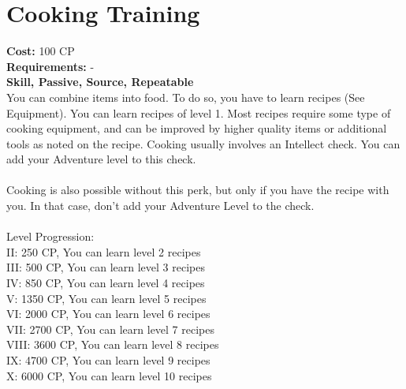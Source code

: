 \section{Cooking Training}
\textbf{Cost:} 100 CP\\
\textbf{Requirements:} -\\
\textbf{Skill, Passive, Source, Repeatable}\\
You can combine items into food. To do so, you have to learn recipes (See Equipment). You can learn recipes of level 1. Most recipes require some type of cooking equipment, and can be improved by higher quality items or additional tools as noted on the recipe. Cooking usually involves an Intellect check. You can add your Adventure level to this check. \\
\\
Cooking is also possible without this perk, but only if you have the recipe with you. In that case, don't add your Adventure Level to the check.\\
\\
Level Progression:\\
II: 250 CP, You can learn level 2 recipes\\
III: 500 CP, You can learn level 3 recipes\\
IV: 850 CP, You can learn level 4 recipes\\
V: 1350 CP, You can learn level 5 recipes\\
VI: 2000 CP, You can learn level 6 recipes\\
VII: 2700 CP, You can learn level 7 recipes\\
VIII: 3600 CP, You can learn level 8 recipes\\
IX: 4700 CP, You can learn level 9 recipes\\
X: 6000 CP, You can learn level 10 recipes\\